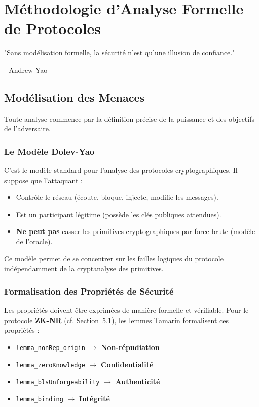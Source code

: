 \chapter{Méthodologie d'Analyse Formelle de Protocoles}
\label{chap:18}

\epigraph{"Sans modélisation formelle, la sécurité n'est qu'une illusion de confiance."}{- Andrew Yao}

\section{Modélisation des Menaces}
\label{sec:18.1}

Toute analyse commence par la définition précise de la puissance et des objectifs de l'adversaire.

\subsection{Le Modèle Dolev-Yao}
\label{subsec:18.1.1}

C'est le modèle standard pour l'analyse des protocoles cryptographiques. Il suppose que l'attaquant :
\begin{itemize}
    \item Contrôle le réseau (écoute, bloque, injecte, modifie les messages).
    \item Est un participant légitime (possède les clés publiques attendues).
    \item \textbf{Ne peut pas} casser les primitives cryptographiques par force brute (modèle de l'oracle).
\end{itemize}
Ce modèle permet de se concentrer sur les failles logiques du protocole indépendamment de la cryptanalyse des primitives.

\subsection{Formalisation des Propriétés de Sécurité}
\label{subsec:18.1.2}

Les propriétés doivent être exprimées de manière formelle et vérifiable. Pour le protocole \textbf{ZK-NR} (cf. Section~5.1), les lemmes Tamarin formalisent ces propriétés :
\begin{itemize}
    \item \texttt{lemma\_nonRep\_origin} $\rightarrow$ \textbf{Non-répudiation}
    \item \texttt{lemma\_zeroKnowledge} $\rightarrow$ \textbf{Confidentialité}
    \item \texttt{lemma\_blsUnforgeability} $\rightarrow$ \textbf{Authenticité}
    \item \texttt{lemma\_binding} $\rightarrow$ \textbf{Intégrité}
\end{itemize}


